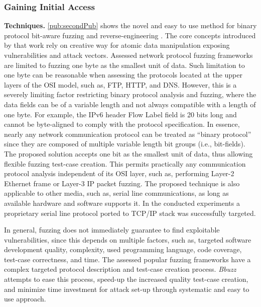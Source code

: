 \subsubsection{Gaining Initial Access}
\label{sec:access}
\textbf{Techniques.}
\ref{pub:secondPub} shows the novel and easy to use method for binary protocol bit-aware fuzzing and reverse-engineering \cite{Blumbergs2017}.
The core concepts introduced by that work rely on creative way for atomic data manipulation exposing vulnerabilities and attack vectors.
Assessed network protocol fuzzing frameworks are limited to fuzzing one byte as the smallest unit of data. Such limitation to one byte can be reasonable when assessing the protocols located at the upper layers of the OSI model, such as, FTP, HTTP, and DNS. However, this is a severely limiting factor restricting binary protocol analysis and fuzzing, where the data fields can be of a variable length and not always compatible with a length of one byte. For example, the IPv6 header Flow Label field is 20 bits long and cannot be byte-aligned to comply with the protocol specification. In essence, nearly any network communication protocol can be treated as ``binary protocol'' since they are composed of multiple variable length bit groups (i.e., bit-fields). The proposed solution accepts one bit as the smallest unit of data, thus allowing flexible fuzzing test-case creation. This permits practically any communication protocol analysis independent of its OSI layer, such as, performing Layer-2 Ethernet frame or Layer-3 IP packet fuzzing. The proposed technique is also applicable to other media, such as, serial line communications, as long as available hardware and software supports it. In the conducted experiments a proprietary serial line protocol ported to TCP/IP stack was successfully targeted.

In general, fuzzing does not immediately guarantee to find exploitable vulnerabilities, since this depends on multiple factors, such as, targeted software development quality, complexity, used programming language, code coverage, test-case correctness, and time. The assessed popular fuzzing frameworks have a complex targeted protocol description and test-case creation process.
\textit{Bbuzz} attempts to ease this process, speed-up the increased quality test-case creation, and minimize time investment for attack set-up through systematic and easy to use approach.

